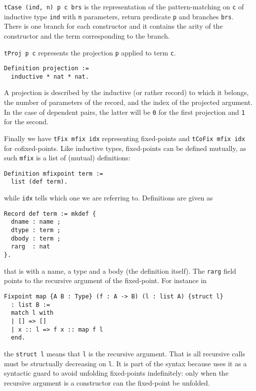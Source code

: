 \texttt{tCase (ind, n) p c brs} is the representation of the
pattern-matching on \texttt{c} of inductive type \texttt{ind}
with \texttt{n} parameters, return predicate \texttt{p}
and branches \texttt{brs}.
There is one branch for each constructor and it contains the arity of the
constructor and the term corresponding to the branch.

\texttt{tProj p c} represents the projection \texttt{p}
applied to term \texttt{c}.
\begin{verbatim}
Definition projection :=
  inductive * nat * nat.
\end{verbatim}
A projection is described by the inductive (or rather record) to which it
belongs, the number of parameters of the record, and the index of the projected
argument. In the case of dependent pairs, the latter will be \texttt{0}
for the first projection and \texttt{1} for the second.

Finally we have \texttt{tFix mfix idx} representing fixed-points and
\texttt{tCoFix mfix idx} for cofixed-points.
Like inductive types, fixed-points can be defined mutually, as such
\texttt{mfix} is a list of (mutual) definitions:
\begin{verbatim}
Definition mfixpoint term :=
  list (def term).
\end{verbatim}
while \texttt{idx} tells which one we are referring to.
Definitions are given as
\begin{verbatim}
Record def term := mkdef {
  dname : name ;
  dtype : term ;
  dbody : term ;
  rarg  : nat
}.
\end{verbatim}
that is with a name, a type and a body (the definition itself).
The \texttt{rarg} field points to the recursive argument of the
fixed-point.
For instance in
\begin{verbatim}
Fixpoint map {A B : Type} (f : A -> B) (l : list A) {struct l}
  : list B :=
  match l with
  | [] => []
  | x :: l => f x :: map f l
  end.
\end{verbatim}
the \texttt{{struct l}} means that \texttt{l} is the recursive
argument. That is all recursive calls must be structually decreasing on
\texttt{l}. It is part of the syntax because \Coq uses it as a
syntactic guard to avoid unfolding fixed-points indefinitely: only when the
recursive argument is a constructor can the fixed-point be unfolded.


